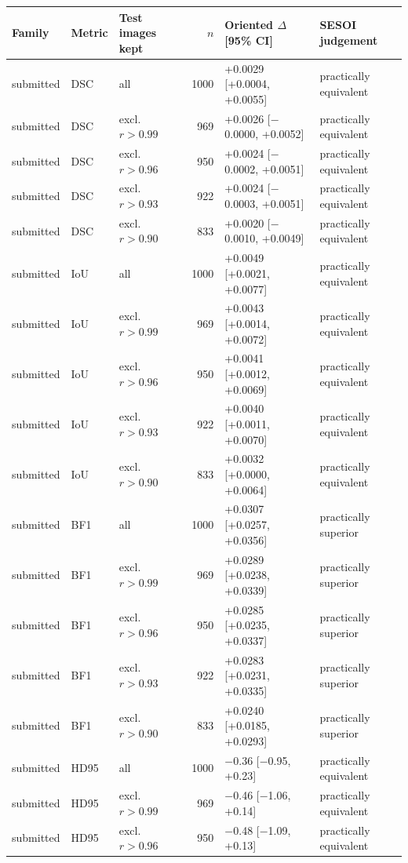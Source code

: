 \begin{tabular}{lllrll}
\toprule
Family & Metric & Test images kept & $n$ & Oriented $\Delta$ [95\% CI] & SESOI judgement \\
\midrule
submitted & DSC & all & 1000 & +0.0029 [+0.0004, +0.0055] & practically equivalent \\
submitted & DSC & excl. $r>0.99$ & 969 & +0.0026 [$-$0.0000, +0.0052] & practically equivalent \\
submitted & DSC & excl. $r>0.96$ & 950 & +0.0024 [$-$0.0002, +0.0051] & practically equivalent \\
submitted & DSC & excl. $r>0.93$ & 922 & +0.0024 [$-$0.0003, +0.0051] & practically equivalent \\
submitted & DSC & excl. $r>0.90$ & 833 & +0.0020 [$-$0.0010, +0.0049] & practically equivalent \\
submitted & IoU & all & 1000 & +0.0049 [+0.0021, +0.0077] & practically equivalent \\
submitted & IoU & excl. $r>0.99$ & 969 & +0.0043 [+0.0014, +0.0072] & practically equivalent \\
submitted & IoU & excl. $r>0.96$ & 950 & +0.0041 [+0.0012, +0.0069] & practically equivalent \\
submitted & IoU & excl. $r>0.93$ & 922 & +0.0040 [+0.0011, +0.0070] & practically equivalent \\
submitted & IoU & excl. $r>0.90$ & 833 & +0.0032 [+0.0000, +0.0064] & practically equivalent \\
submitted & BF1 & all & 1000 & +0.0307 [+0.0257, +0.0356] & practically superior \\
submitted & BF1 & excl. $r>0.99$ & 969 & +0.0289 [+0.0238, +0.0339] & practically superior \\
submitted & BF1 & excl. $r>0.96$ & 950 & +0.0285 [+0.0235, +0.0337] & practically superior \\
submitted & BF1 & excl. $r>0.93$ & 922 & +0.0283 [+0.0231, +0.0335] & practically superior \\
submitted & BF1 & excl. $r>0.90$ & 833 & +0.0240 [+0.0185, +0.0293] & practically superior \\
submitted & HD95 & all & 1000 & $-$0.36 [$-$0.95, +0.23] & practically equivalent \\
submitted & HD95 & excl. $r>0.99$ & 969 & $-$0.46 [$-$1.06, +0.14] & practically equivalent \\
submitted & HD95 & excl. $r>0.96$ & 950 & $-$0.48 [$-$1.09, +0.13] & practically equivalent \\

\end{tabular}
